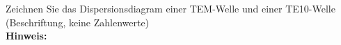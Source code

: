 \begin{question}[section=6,name={Dispersionsdiagram},difficulty=,quantity=1,type=thr,tags={}]
	Zeichnen Sie das Dispersionsdiagram einer TEM-Welle und einer TE10-Welle (Beschriftung, keine Zahlenwerte)
	\\ \textbf{Hinweis:}\\
	
\end{question}
\begin{solution}
	
\end{solution}